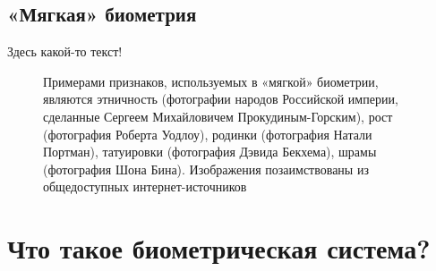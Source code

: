 \documentclass[12pt]{book}
\begin{document}
\subsection{«Мягкая» биометрия}

\large{Здесь какой-то текст!}

\begin{figure}[h]
\caption{Примерами признаков, используемых в «мягкой» биометрии, являются этничность (фотографии народов Российской империи, сделанные Сергеем Михайловичем Прокудиным-Горским), рост (фотография Роберта Уодлоу), родинки (фотография Натали Портман), татуировки (фотография Дэвида Бекхема), шрамы (фотография Шона Бина). Изображения позаимствованы из общедоступных интернет-источников}
\label{fig:figure_1_6}
\end{figure}

\section{Что такое биометрическая система?}
\end{document}

